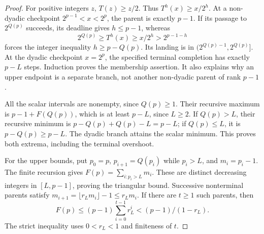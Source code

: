 \documentclass[11pt]{article}
\theoremstyle{remark}\newtheorem{remark}[proposition]{Remark}
\begin{document}
\begin{proof}
For positive integers \(z\), \(T(z)\ge z/2\). Thus
\(T^h(x)\ge x/2^h\). At a non-dyadic checkpoint
\(2^{p-1}<x<2^p\), the parent is exactly \(p-1\).
If its passage to \(2^{Q(p)}\) succeeds, its deadline gives \(h\le p-1\),
whereas
\[
 2^{Q(p)}\ge T^h(x)\ge x/2^h>2^{p-1-h}
\]
forces the integer inequality \(h\ge p-Q(p)\).
Its landing is in \((2^{Q(p)-1},2^{Q(p)}]\).
At the dyadic checkpoint \(x=2^p\), the specified terminal completion
has exactly \(p-L\) steps. Induction proves the membership assertion.
It also explains why an upper endpoint is a separate branch, not
another non-dyadic parent of rank \(p-1\).

All the scalar intervals are nonempty, since \(Q(p)\ge1\).
Their recursive maximum is \(p-1+F(Q(p))\), which is at least
\(p-L\), since \(L\ge2\). If \(Q(p)>L\), their recursive minimum is
\(p-Q(p)+Q(p)-L=p-L\); if \(Q(p)\le L\), it is
\(p-Q(p)\ge p-L\). The dyadic branch attains the scalar minimum.
This proves both extrema, including the terminal overshoot.

For the upper bounds, put \(p_0=p\), \(p_{i+1}=Q(p_i)\) while
\(p_i>L\), and \(m_i=p_i-1\). The finite recursion gives
\(F(p)=\sum_{i:p_i>L}m_i\).
These are distinct decreasing integers in \([L,p-1]\), proving
the triangular bound. Successive nonterminal parents satisfy
\(m_{i+1}=\lfloor r_Lm_i\rfloor-1\le r_Lm_i\).
If there are \(t\ge1\) such parents, then
\[
 F(p)\le(p-1)\sum_{i=0}^{t-1}r_L^i
       <(p-1)/(1-r_L).
\]
The strict inequality uses \(0<r_L<1\) and finiteness of \(t\).
\end{proof}
\end{document}
